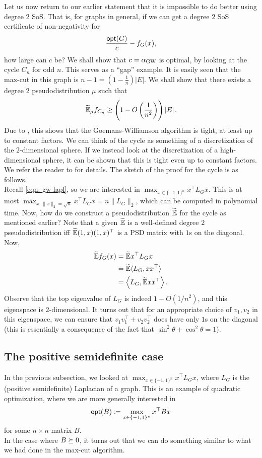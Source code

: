 	Let us now return to our earlier statement that it is impossible to do better using degree $2$ SoS. That is, for graphs in general, if we can get a degree $2$ SoS certificate of non-negativity for
	\[ \frac{\mathsf{opt}(G)}{c} - f_G(x), \]
	how large can $c$ be? We shall show that $c = \alpha_{\text{GW}}$ is optimal, by looking at the cycle $C_n$ for odd $n$. This serves as a ``gap'' example. It is easily seen that the max-cut in this graph is $n-1 = \left( 1 - \frac{1}{n} \right) |E|$. We shall show that there exists a degree $2$ pseudodistribution $\mu$ such that
	\[ \widetilde{\mathbb{E}}_\mu f_{C_n} \ge \left( 1 - O\left(\frac{1}{n^2}\right) \right) |E|. \]
	Due to , this shows that the Goemans-Williamson algorithm is tight, at least up to constant factors. We can think of the cycle as something of a discretization of the $2$-dimensional sphere. If we instead look at the discretization of a high-dimensional sphere, it can be shown that this is tight even up to constant factors. We refer the reader to \cite{gw-tight-feige-schechtman} for details. The sketch of the proof for the cycle is as follows.\\
	Recall \cref{eqn: gw-lapl}, so we are interested in $\max_{x \in \{-1,1\}^n} x^\top L_G x$. This is at most $\max_{x : \|x\|_2 = \sqrt{n}} x^\top L_G x = n\|L_G\|_2$, which can be computed in polynomial time. Now, how do we construct a pseudodistribution $\widetilde{\mathbb{E}}$ for the cycle as mentioned earlier? Note that a given $\widetilde{\mathbb{E}}$ is a well-defined degree $2$ pseudodistribution iff $\widetilde{\mathbb{E}} (1,x) (1,x)^\top$ is a PSD matrix with $1$s on the diagonal. Now,
	\begin{align*}
		\widetilde{\mathbb{E}} f_G(x) &= \widetilde{\mathbb{E}} x^\top L_G x \\
			&= \widetilde{\mathbb{E}} \langle L_G , xx^\top \rangle \\
			&= \left\langle L_G , \widetilde{\mathbb{E}} xx^\top \right\rangle.
	\end{align*}
	Observe that the top eigenvalue of $L_G$ is indeed $1 - O(1/n^2)$, and this eigenspace is $2$-dimensional. It turns out that for an appropriate choice of $v_1,v_2$ in this eigenspace, we can ensure that $v_1v_1^\top + v_2v_2^\top$ does have only $1$s on the diagonal (this is essentially a consequence of the fact that $\sin^2\theta+\cos^2\theta = 1$).

\subsection{The positive semidefinite case}

	In the previous subsection, we looked at $\max_{x \in \{-1,1\}^n} x^\top L_G x$, where $L_G$ is the (positive semidefinite) Laplacian of a graph. This is an example of quadratic optimization, where we are more generally interested in
	\[ \mathsf{opt}(B) \coloneqq \max_{x \in \{-1,1\}^n} x^\top B x \]
	for some $n \times n$ matrix $B$.\\
	In the case where $B \succeq 0$, it turns out that we can do something similar to what we had done in the max-cut algorithm.

